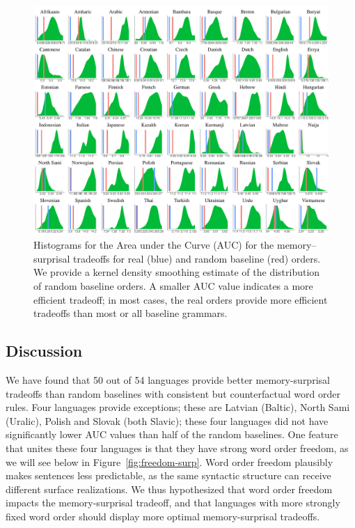 \begin{figure}
	\begin{center}
\includegraphics[width=\textwidth]{auc-table_MLE.pdf}
\end{center}
\caption{Histograms for the Area under the Curve (AUC) for the memory--surprisal tradeoffs for real (blue) and random baseline (red) orders.
We provide a kernel density smoothing estimate of the distribution of random baseline orders.
A smaller AUC value indicates a more efficient tradeoff; in most cases, the real orders provide more efficient tradeoffs than most or all baseline grammars.
}\label{fig:auc}
\end{figure}




\subsection{Discussion}\label{subsec:expt2-discussion}

We have found that 50 out of 54 languages provide better memory-surprisal tradeoffs than random baselines with consistent but counterfactual word order rules.
Four languages provide exceptions; these are Latvian (Baltic), North Sami (Uralic), Polish and Slovak (both Slavic); these four languages did not have significantly lower AUC values than half of the random baselines.
One feature that unites these four languages is that they have strong word order freedom, as we will see below in Figure~\ref{fig:freedom-surp}. %
Word order freedom plausibly makes sentences less predictable, as the same syntactic structure can receive different surface realizations.
We thus hypothesized that word order freedom  impacts the memory-surprisal tradeoff, and that languages with more strongly fixed word order should display more optimal memory-surprisal tradeoffs.


